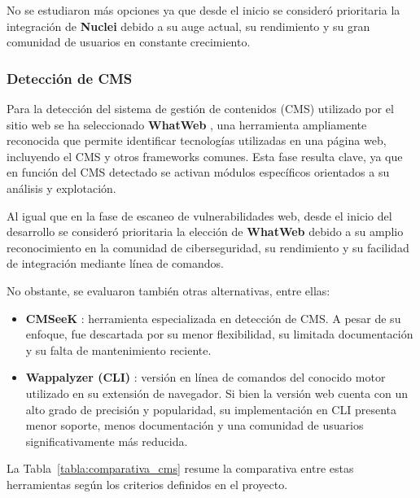 \begin{parskipenv}
No se estudiaron más opciones ya que desde el inicio se consideró prioritaria la integración de \textbf{Nuclei} debido a su auge actual, su rendimiento y su gran comunidad de usuarios en constante crecimiento.

\subsubsection*{Detección de CMS}
Para la detección del sistema de gestión de contenidos (CMS) utilizado por el sitio web se ha seleccionado \textbf{WhatWeb} \cite{whatweb}, una herramienta ampliamente reconocida que permite identificar tecnologías utilizadas en una página web, incluyendo el CMS y otros frameworks comunes. Esta fase resulta clave, ya que en función del CMS detectado se activan módulos específicos orientados a su análisis y explotación.

Al igual que en la fase de escaneo de vulnerabilidades web, desde el inicio del desarrollo se consideró prioritaria la elección de \textbf{WhatWeb} debido a su amplio reconocimiento en la comunidad de ciberseguridad, su rendimiento y su facilidad de integración mediante línea de comandos.

No obstante, se evaluaron también otras alternativas, entre ellas:

\begin{itemize}
    \item \textbf{CMSeeK} \cite{cmseek}: herramienta especializada en detección de CMS. A pesar de su enfoque, fue descartada por su menor flexibilidad, su limitada documentación y su falta de mantenimiento reciente.

    \item \textbf{Wappalyzer (CLI)} \cite{wappalyzercli}: versión en línea de comandos del conocido motor utilizado en su extensión de navegador. Si bien la versión web cuenta con un alto grado de precisión y popularidad, su implementación en CLI presenta menor soporte, menos documentación y una comunidad de usuarios significativamente más reducida.
\end{itemize}

La Tabla~\ref{tabla:comparativa_cms} resume la comparativa entre estas herramientas según los criterios definidos en el proyecto.


\end{parskipenv}
